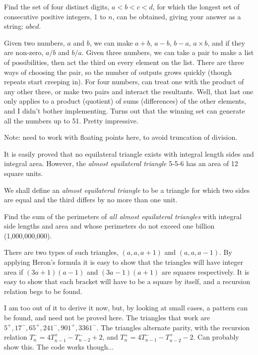 Find the set of four distinct digits, $a < b < c < d$, for which the longest set of consecutive positive integers, 1 to $n$, can be obtained, giving your answer as a string: $abcd$.

Given two numbers, $a$ and $b$, we can make $a+b$, $a-b$, $b-a$, $a\times b$, and if they are non-zero, $a/b$ and $b/a$.
Given three numbers, we can take a pair to make a list of possibilities, then act the third on every element on the list.
There are three ways of choosing the pair, so the number of outputs grows quickly (though repeats start creeping in).  For four numbers, can treat one with the product of any other three, or make two pairs and interact the resultants.  Well, that last one  only applies to a product (quotient) of sums (differences) of the other elements, and I didn't bother implementing.
Turns out that the winning set can generate all the numbers up to 51.  Pretty impressive.

\footnotesize
Note: need to work with floating points here, to avoid truncation of division.
\normalsize




It is easily proved that no equilateral triangle exists with integral length sides and integral area. However, the \emph{almost equilateral triangle} 5-5-6 has an area of 12 square units.

We shall define an \emph{almost equilateral triangle} to be a triangle for which two sides are equal and the third differs by no more than one unit.

Find the sum of the perimeters of \emph{all almost equilateral triangles} with integral side lengths and area and whose perimeters do not exceed one billion (1,000,000,000).

There are two types of such triangles, $(a,a,a+1)$ and $(a,a,a-1)$.  By applying Heron's formula it is easy to show
that the triangles will have integer area if $(3a+1)(a-1)$ and $(3a-1)(a+1)$ are squares respectively.  It is easy to show
that each bracket will have to be a square by itself, and a recursion relation begs to be found.

I am too out of it to derive it now, but, by looking at small cases, a pattern can be found, and need not be proved here.
The triangles that work are $5^+, 17^-, 65^+, 241^-, 901^+, 3361^-$.  The triangles alternate parity, with the recursion relation $T_n^- = 4T_{n-1}^+-T_{n-2}^-+2$, and $T_n^+ = 4T_{n-1}^--T_{n-2}^+-2$.  Can probably show this.  The code works though...

